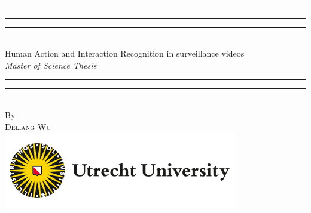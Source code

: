 %
%
% 
%
%
\begin{titlingpage}
\begin{SingleSpace}
\calccentering{\unitlength} 
\begin{adjustwidth*}{\unitlength}{-\unitlength}
\vspace*{6mm}
\begin{center}
\rule[0.5ex]{\linewidth}{2pt}\vspace*{-\baselineskip}\vspace*{3.2pt}
\rule[0.5ex]{\linewidth}{1pt}\\[\baselineskip]
{\HUGE Human Action and Interaction Recognition in surveillance videos  }\\[6mm]
{\Large \textit{Master of Science Thesis}}\\
\rule[0.5ex]{\linewidth}{1pt}\vspace*{-\baselineskip}\vspace{3.2pt}
\rule[0.5ex]{\linewidth}{2pt}\\
\vspace{6.5mm}
{\large By}\\
{\large\textsc{Deliang Wu}}\\
\vspace{5mm}
\includegraphics[scale=0.8]{logos/uu.png}\\
\vspace{3mm}

\end{center}
\end{adjustwidth*}
\end{SingleSpace}
\end{titlingpage}
